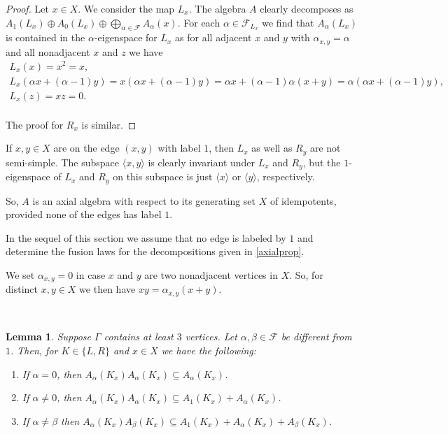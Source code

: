 \documentclass[oneside,a4paper]{amsart} %
\newtheorem{lemma}[proposition]{Lemma}
\theoremstyle{definition}
\begin{document}
\begin{proof}
Let $x\in X$. We consider the map $L_x$.
The algebra  $A$ clearly decomposes as $A_1(L_x)\oplus A_0(L_x)\oplus \bigoplus_{\alpha\in \mathcal{F}} A_{\alpha}(x)$.
For each $\alpha\in \mathcal{F}_{L_x}$ we find that $A_{\alpha}(L_x)$ is contained in the  $\alpha$-eigenspace for $L_x$  as
for all adjacent $x$ and $y$ with $\alpha_{x,y}=\alpha$ and all nonadjacent $x$ and $z$ we have
$$\begin{array}{l}
L_x(x)=x^2=x,\\
L_x(\alpha x+(\alpha-1)y)=x(\alpha x+(\alpha-1)y)=\alpha x+(\alpha-1)\alpha (x+y)=\alpha(\alpha x+(\alpha-1)y),\\
L_x(z)=xz=0.\\
\end{array}$$

The proof for $R_x$ is similar.
\end{proof}

If $x,y\in X$ are on the edge $(x,y)$ with label $1$, then 
$L_x$ as well as $R_y$ are  not semi-simple.
The subspace $\langle x,y\rangle$ is clearly invariant under $L_x$ and $R_y$, but the $1$-eigenspace of $L_x$ and $R_y$ on this subspace
is just $\langle x\rangle$ or $\langle y\rangle$, respectively.

So, $A$ is an axial algebra with respect to its generating set $X$ of idempotents, provided none of the edges has label $1$.

In the sequel of this section we assume that no edge is labeled by $1$ and  determine the fusion laws for  the decompositions given in
\cref{axialprop}.

We set $\alpha_{x,y}=0$ in case $x$ and $y$ are two nonadjacent vertices in $ X$.
So, for distinct $x,y\in X$ we then have $xy=\alpha_{x,y}(x+y)$.

\

\begin{lemma}\label{fusionlemma}
Suppose $\Gamma$ contains at least $3$ vertices.
Let $\alpha,\beta\in \mathcal{F}$ be different from $1$.
Then, for $K\in \{L,R\}$ and $x\in X$ we have the following:
\begin{enumerate}
\item If $\alpha=0$, then $A_\alpha(K_x)A_\alpha(K_x)\subseteq A_\alpha(K_x)$.
\item If $\alpha\neq 0$, then $A_\alpha(K_x)A_\alpha(K_x)\subseteq A_1(K_x)+A_\alpha(K_x)$. 
\item If $\alpha\neq \beta$ %
then $A_\alpha(K_x)A_\beta(K_x)\subseteq A_1(K_x)+A_\alpha(K_x)+A_\beta(K_x)$.
\end{enumerate}
\end{lemma}
\end{document}
